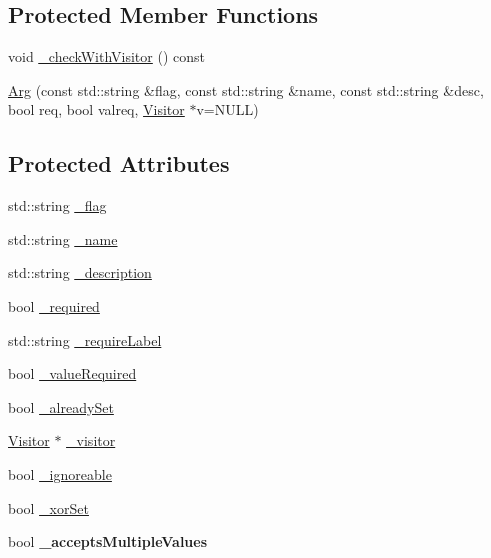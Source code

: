\subsection*{Protected Member Functions}
\begin{DoxyCompactItemize}
\item 
void \hyperlink{class_t_c_l_a_p_1_1_arg_aa963d0d4c8cb297e1f4cf74143bf6d1b}{\+\_\+check\+With\+Visitor} () const 
\item 
\hyperlink{class_t_c_l_a_p_1_1_arg_ab25a06db5edf82a5b965b641b3c63372}{Arg} (const std\+::string \&flag, const std\+::string \&name, const std\+::string \&desc, bool req, bool valreq, \hyperlink{class_t_c_l_a_p_1_1_visitor}{Visitor} $\ast$v=N\+U\+L\+L)
\end{DoxyCompactItemize}
\subsection*{Protected Attributes}
\begin{DoxyCompactItemize}
\item 
std\+::string \hyperlink{class_t_c_l_a_p_1_1_arg_ae68407a0a8223023ad0ae3b9dc7986f5}{\+\_\+flag}
\item 
std\+::string \hyperlink{class_t_c_l_a_p_1_1_arg_ac0f138057a99fb5d94ff4acb41a083aa}{\+\_\+name}
\item 
std\+::string \hyperlink{class_t_c_l_a_p_1_1_arg_a9882fe256eaab01ac53db54ac657d272}{\+\_\+description}
\item 
bool \hyperlink{class_t_c_l_a_p_1_1_arg_ad16408bd1ca4d8b1d14d6c5129545a84}{\+\_\+required}
\item 
std\+::string \hyperlink{class_t_c_l_a_p_1_1_arg_a2ed097a868e34a0c4f6062ead744ac54}{\+\_\+require\+Label}
\item 
bool \hyperlink{class_t_c_l_a_p_1_1_arg_a776682b7e19f4dc231bbad3d10034dfa}{\+\_\+value\+Required}
\item 
bool \hyperlink{class_t_c_l_a_p_1_1_arg_a829e32129857d2683e5791a5df1208ec}{\+\_\+already\+Set}
\item 
\hyperlink{class_t_c_l_a_p_1_1_visitor}{Visitor} $\ast$ \hyperlink{class_t_c_l_a_p_1_1_arg_aa9ff037e92c9fa5bd85e532f61899300}{\+\_\+visitor}
\item 
bool \hyperlink{class_t_c_l_a_p_1_1_arg_a9832bb7564f4ab472bd51b7b1bbc683f}{\+\_\+ignoreable}
\item 
bool \hyperlink{class_t_c_l_a_p_1_1_arg_ab413bd1d8a7ecf3c89672ee23ef791ba}{\+\_\+xor\+Set}
\item 
\hypertarget{class_t_c_l_a_p_1_1_arg_a13130a9a5d22c57a6d42a8883c9b1e0f}{bool {\bfseries \+\_\+accepts\+Multiple\+Values}}\label{class_t_c_l_a_p_1_1_arg_a13130a9a5d22c57a6d42a8883c9b1e0f}

\end{DoxyCompactItemize}


